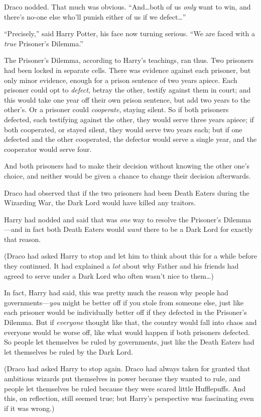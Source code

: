 Draco nodded. That much was obvious.
“And…both of us \emph{only} want to win, and there’s no-one else who’ll punish either of us if we defect…”

“Precisely,” said Harry Potter, his face now turning serious.
“We are faced with a \emph{true} Prisoner’s Dilemma.”

The Prisoner’s Dilemma, according to Harry’s teachings, ran thus. Two prisoners had been locked in separate cells. There was evidence against each prisoner, but only minor evidence, enough for a prison sentence of two years apiece. Each prisoner could opt to \emph{defect}, betray the other, testify against them in court; and this would take one year off their own prison sentence, but add two years to the other’s. Or a prisoner could \emph{cooperate}, staying silent. So if both prisoners defected, each testifying against the other, they would serve three years apiece; if both cooperated, or stayed silent, they would serve two years each; but if one defected and the other cooperated, the defector would serve a single year, and the cooperator would serve four.

And both prisoners had to make their decision without knowing the other one’s choice, and neither would be given a chance to change their decision afterwards.

Draco had observed that if the two prisoners had been Death Eaters during the Wizarding War, the Dark Lord would have killed any traitors.

Harry had nodded and said that was \emph{one} way to resolve the Prisoner’s Dilemma—and in fact both Death Eaters would \emph{want} there to be a Dark Lord for exactly that reason.

(Draco had asked Harry to stop and let him to think about this for a while before they continued. It had explained a \emph{lot} about why Father and his friends had agreed to serve under a Dark Lord who often wasn’t nice to them…)

In fact, Harry had said, this was pretty much the reason why people had governments—\emph{you} might be better off if you stole from someone else, just like each prisoner would be individually better off if they defected in the Prisoner’s Dilemma. But if \emph{everyone} thought like that, the country would fall into chaos and everyone would be worse off, like what would happen if both prisoners defected. So people let themselves be ruled by governments, just like the Death Eaters had let themselves be ruled by the Dark Lord.

(Draco had asked Harry to stop again. Draco had always taken for granted that ambitious wizards put themselves in power because they wanted to rule, and people let themselves be ruled because they were scared little Hufflepuffs. And this, on reflection, still seemed true; but Harry’s perspective was fascinating even if it was wrong.)

